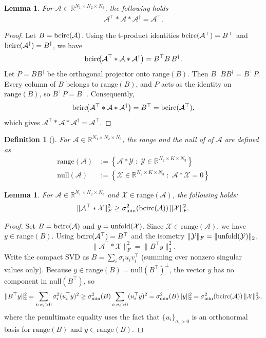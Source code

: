 \documentclass[11pt]{article}
\newtheorem{definition}[theorem]{Definition}
\newtheorem{lemma}[theorem]{Lemma}
\newcommand{\ran}{\mathrm{range}}
\def\fm#1{\mathcal{#1}}
\def\r{\mathbb{R}}
\begin{document}
\begin{lemma}\label{lem:lem-10}
For $\fm A\in \r^{N_1\times N_2\times N_3}$, the following holds
\begin{align}
\fm A^\top * \fm A * \fm A^\dagger = \fm A^\top.
\end{align}
\end{lemma}
\begin{proof}
Let $B = \bcirc(\fm A)$.  Using the t-product identities
$\bcirc(\fm A^\top)=B^\top$ and $\bcirc(\fm A^\dagger)=B^\dagger$, we have
\[
  \bcirc\!\bigl(\fm A^\top * \fm A * \fm A^\dagger\bigr) = B^\top B\, B^\dagger.
\]
Let $P = BB^\dagger$ be the orthogonal projector onto $\ran(B)$.
Then $B^\top B B^\dagger = B^\top P$.
Every column of $B$ belongs to $\ran(B)$, and $P$ acts as the identity on $\ran(B)$,
so $B^\top P = B^\top$.
Consequently,
\[
  \bcirc\!\bigl(\fm A^\top * \fm A * \fm A^\dagger\bigr)
  = B^\top = \bcirc(\fm A^\top),
\]
which gives $\fm A^\top * \fm A * \fm A^\dagger = \fm A^\top$.
\end{proof}
\begin{definition}[\cite{an2024randomized}] For $\fm A\in \r^{N_1\times N_2\times N_3}$, the range  and the null of of $\fm A$ are defined as 
\begin{align*}
    \text{range}(\fm A ) &:= \left\{\fm A * \fm Y\; :\; \fm Y\in \r^{N_2\times K\times N_3} \right\}\\
    \text{null}(\fm A) &:= \left\{ \fm X \in \r^{N_2\times K \times N_3 }\;:\; \fm A * \fm X = 0    \right\}
\end{align*}
\end{definition}

\begin{lemma}\label{lem:lem-12}
For $\fm A\in \r^{N_1\times N_2\times N_3}$ and $\fm X\in\ran(\fm A)$, the following holds:
\begin{align}
    \Vert \fm A^\top * \fm X \Vert_F^2 \geq \sigma_{\min}^2\!\left(\bcirc(\fm A)\right)\Vert \fm X \Vert_F^2.
\end{align}
\end{lemma}
\begin{proof}
Set $B = \bcirc(\fm A)$ and $y = \unfold(\fm X)$.
Since $\fm X\in\ran(\fm A)$, we have $y\in\ran(B)$.
Using $\bcirc(\fm A^\top)=B^\top$ and the isometry $\|\fm Y\|_F = \|\unfold(\fm Y)\|_2$,
\[
  \|\fm A^\top * \fm X\|_F^2 = \|B^\top y\|_2^2.
\]
Write the compact SVD as $B = \sum_{i} \sigma_i u_i v_i^\top$ (summing over nonzero singular values only).
Because $y\in\ran(B)=\mathrm{null}(B^\top)^\perp$, the vector $y$ has no component in $\mathrm{null}(B^\top)$, so
\[
  \|B^\top y\|_2^2
  = \sum_{i:\,\sigma_i>0} \sigma_i^2 (u_i^\top y)^2
  \geq \sigma_{\min}^2(B)\sum_{i:\,\sigma_i>0}(u_i^\top y)^2
  = \sigma_{\min}^2(B)\|y\|_2^2
  = \sigma_{\min}^2\!\left(\bcirc(\fm A)\right)\|\fm X\|_F^2,
\]
where the penultimate equality uses the fact that $\{u_i\}_{\sigma_i>0}$
is an orthonormal basis for $\ran(B)$ and $y\in\ran(B)$.
\end{proof}
\end{document}
